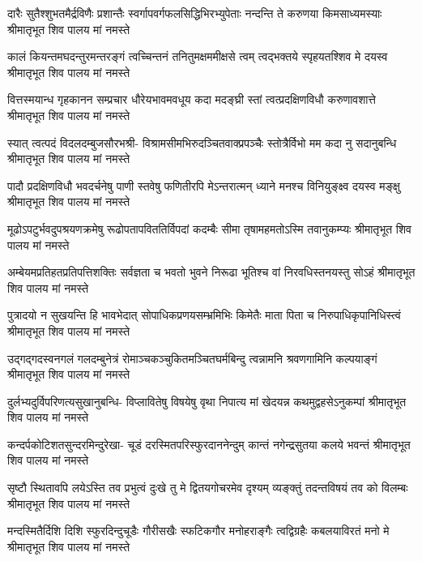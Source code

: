 \fourlineindentedshloka
{दारैः सुतैश्शुभतमैर्द्रविणैः प्रशान्तैः}
{स्वर्गापवर्गफलसिद्धिभिरभ्युपेताः}
{नन्दन्ति ते करुणया किमसाध्यमस्याः}
{श्रीमातृभूत शिव पालय मां नमस्ते} %

\fourlineindentedshloka
{कालं कियन्तमघदन्तुरमन्तरङ्गं}
{त्वच्चिन्तनं तनितुमक्षममीक्षसे त्वम्}
{त्वद्भक्तये स्पृहयतश्शिव मे दयस्व}
{श्रीमातृभूत शिव पालय मां नमस्ते} %

\fourlineindentedshloka
{वित्तस्मयान्ध गृहकानन सम्प्रचार}
{धौरेयभावमवधूय कदा मदङ्घ्री}
{स्तां त्वत्प्रदक्षिणविधौ करुणावशात्ते}
{श्रीमातृभूत शिव पालय मां नमस्ते} %

\fourlineindentedshloka
{स्यात् त्वत्पदं विदलदम्बुजसौरभश्री-}
{विश्रामसीमभिरुदञ्चितवाक्प्रपञ्चैः}
{स्तोत्रैर्विभो मम कदा नु सदानुबन्धि}
{श्रीमातृभूत शिव पालय मां नमस्ते} %

\fourlineindentedshloka
{पादौ प्रदक्षिणविधौ भवदर्चनेषु}
{पाणी स्तवेषु फणितीरपि मेऽन्तरात्मन्}
{ध्याने मनश्च विनियुङ्क्ष्व दयस्व मङ्क्षु}
{श्रीमातृभूत शिव पालय मां नमस्ते} %

\fourlineindentedshloka
{मूढोऽपटुर्भवदुपश्रयणक्रमेषु}
{रूढोपतापविततिर्विपदां कदम्बैः}
{सीमा तृषामहमतोऽस्मि तवानुकम्प्यः}
{श्रीमातृभूत शिव पालय मां नमस्ते} %

\fourlineindentedshloka
{अम्बेयमप्रतिहतप्रतिपत्तिशक्तिः}
{सर्वज्ञता च भवतो भुवने निरूढा}
{भूतिश्च वां निरवधिस्तनयस्तु सोऽहं}
{श्रीमातृभूत शिव पालय मां नमस्ते} %

\fourlineindentedshloka
{पुत्रादयो न सुखयन्ति हि भावभेदात्}
{सोपाधिकप्रणयसम्भ्रमिभिः किमेतैः}
{माता पिता च निरुपाधिकृपानिधिस्त्वं}
{श्रीमातृभूत शिव पालय मां नमस्ते} %

\fourlineindentedshloka
{उद्गद्गदस्वनगलं गलदम्बुनेत्रं}
{रोमाञ्चकञ्चुकितमञ्चितघर्मबिन्दु}
{त्वन्नामनि श्रवणगामिनि कल्पयाङ्गं}
{श्रीमातृभूत शिव पालय मां नमस्ते} %

\fourlineindentedshloka
{दुर्लभ्यदुर्विपरिणत्यसुखानुबन्धि-}
{विप्लावितेषु विषयेषु वृथा निपात्य}
{मां खेदयन्न कथमुद्वहसेऽनुकम्पां}
{श्रीमातृभूत शिव पालय मां नमस्ते} %

\fourlineindentedshloka
{कन्दर्पकोटिशतसुन्दरमिन्दुरेखा-}
{चूडं दरस्मितपरिस्फुरदाननेन्दुम्}
{कान्तं नगेन्द्रसुतया कलये भवन्तं}
{श्रीमातृभूत शिव पालय मां नमस्ते} %

\fourlineindentedshloka
{सृष्टौ स्थितावपि लयेऽस्ति तव प्रभुत्वं}
{दुःखे तु मे द्वितयगोचरमेव दृश्यम्}
{व्यङ्क्तुं तदन्तविषयं तव को विलम्बः}
{श्रीमातृभूत शिव पालय मां नमस्ते} %

\fourlineindentedshloka
{मन्दस्मितैर्दिशि दिशि स्फुरदिन्दुचूडैः}
{गौरीसखैः स्फटिकगौर मनोहराङ्गैः}
{त्वद्विग्रहैः कबलयाविरतं मनो मे}
{श्रीमातृभूत शिव पालय मां नमस्ते} %

